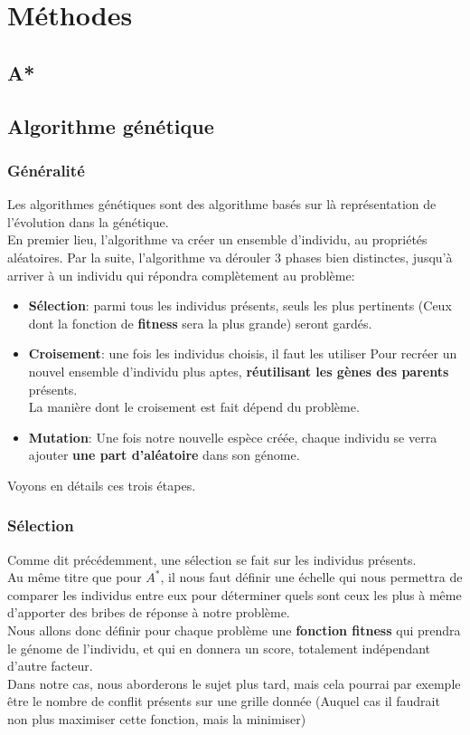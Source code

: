 \chapter{Méthodes}
    \section{A*}
    \section{Algorithme génétique}
        \subsection{Généralité}
            Les algorithmes génétiques sont des algorithme basés sur là représentation de l'évolution dans la génétique.\\
            En premier lieu, l'algorithme va créer un ensemble d'individu, au propriétés aléatoires.
            Par la suite, l'algorithme va dérouler 3 phases bien distinctes, jusqu'à arriver à un individu qui répondra complètement au problème: 
            \begin{itemize}
                \item \textbf{Sélection}: parmi tous les individus présents, seuls les plus pertinents (Ceux dont la fonction de \textbf{fitness} sera la plus grande) seront gardés.
                \item \textbf{Croisement}: une fois les individus choisis, il faut les utiliser Pour recréer un nouvel ensemble d'individu plus aptes, \textbf{réutilisant les gènes des parents} présents.\\
                    La manière dont le croisement est fait dépend du problème.
                \item \textbf{Mutation}: Une fois notre nouvelle espèce créée, chaque individu se verra ajouter \textbf{une part d'aléatoire} dans son génome.
            \end{itemize}
            Voyons en détails ces trois étapes.
        \subsection{Sélection}
            Comme dit précédemment, une sélection se fait sur les individus présents.\\
            Au même titre que pour $A^*$, il nous faut définir une échelle qui nous permettra de comparer les individus entre eux pour déterminer quels sont ceux les plus à même d'apporter des bribes de réponse à notre problème.\\
            Nous allons donc définir pour chaque problème une \textbf{fonction fitness} qui prendra le génome de l'individu, et qui en donnera un score, totalement indépendant d'autre facteur.\\
            Dans notre cas, nous aborderons le sujet plus tard, mais cela pourrai par exemple être le nombre de conflit présents sur une grille donnée (Auquel cas il faudrait non plus maximiser cette fonction, mais la minimiser)

